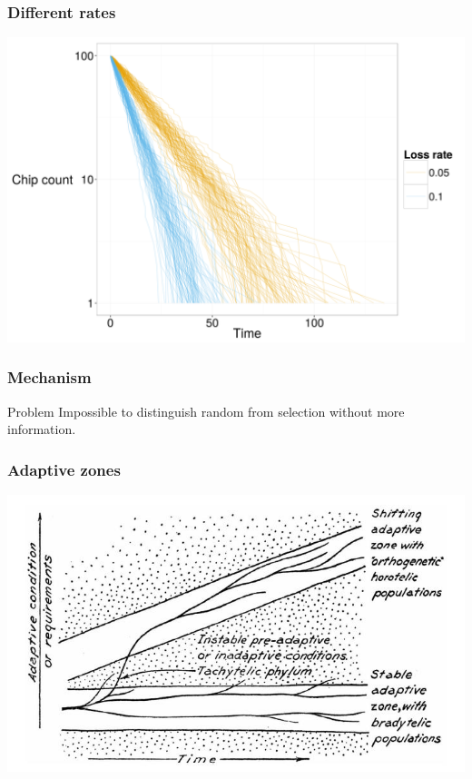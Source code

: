 \documentclass{beamer}
\begin{document}
\begin{frame}
  \frametitle{Different rates}

  \includegraphics[width = \textwidth, height = 0.8\textheight, keepaspectratio = true]{figure/gsame}
\end{frame}


\begin{frame}
  \frametitle{Mechanism}
  \begin{alertblock}{Problem}
    Impossible to distinguish \alert{random} from \alert{selection} without more information.
  \end{alertblock}
\end{frame}


\begin{frame}
  \frametitle{Adaptive zones}

  \begin{center}
    \includegraphics[height = 0.7\textheight, keepaspectratio = true]{figure/simpson}

    \tiny{}
  \end{center}
\end{frame}
\end{document}
